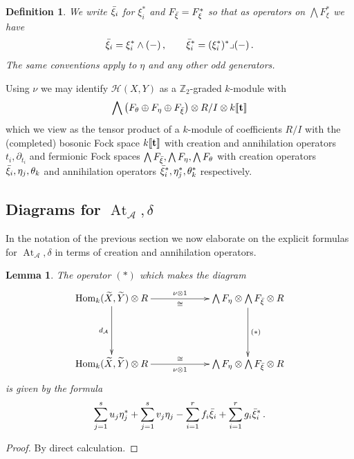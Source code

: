 \documentclass[english,letter paper,12pt,leqno]{article}
\newtheorem{lemma}[theorem]{Lemma}
\theoremstyle{example}
\newtheorem{definition}[theorem]{Definition}
\numberwithin{equation}{section}
\def\AA{\mathcal{A}}
\def\HH{\HH}
\def\HH{\mathcal{H}}
\def\Hom{\operatorname{Hom}}
\def\be{\begin{equation}}
\def\ee{\end{equation}}
\def\nZ{\mathds{Z}}
\DeclareMathOperator{\vAt}{At}
\begin{document}
\begin{definition}\label{defn:bar_convention} We write $\Bar{\xi}_i$ for $\xi_i^*$ and $F_{\Bar{\xi}} = F_\xi^*$ so that as operators on $\bigwedge F_\xi^*$ we have
\[
\Bar{\xi}_i = \xi_i^* \wedge (-)\,, \qquad \Bar{\xi}_i^* = (\xi_i^*)^* \lrcorner (-)\,.
\]
The same conventions apply to $\eta$ and any other odd generators.
\end{definition}

Using $\nu$ we may identify $\HH(X,Y)$ as a $\nZ_2$-graded $k$-module with
\be\label{eq:presentationHHalt}
\bigwedge \big( F_\theta \oplus F_\eta \oplus F_{\Bar{\xi}} \big) \otimes R/I \otimes k\llbracket \bold{t} \rrbracket
\ee
which we view as the tensor product of a $k$-module of coefficients $R/I$ with the (completed) bosonic Fock space $k\llbracket \bold{t} \rrbracket$ with creation and annihilation operators $t_i, \partial_{t_i}$ and fermionic Fock spaces $\bigwedge F_{\Bar{\xi}}, \bigwedge F_\eta, \bigwedge F_\theta$ with creation operators $\Bar{\xi}_i, \eta_j, \theta_k$ and annihilation operators $\Bar{\xi}_i^*, \eta_j^*, \theta_k^*$ respectively. 

\subsection{Diagrams for $\vAt_{\AA}, \delta$}\label{section:fenyman_diagram_1}

In the notation of the previous section we now elaborate on the explicit formulas for $\vAt_{\AA},\delta$ in terms of creation and annihilation operators.

\begin{lemma}\label{lemma:transfer} The operator $(*)$ which makes the diagram
\[
\xymatrix@C+3pc@R+2pc{
\Hom_k( \widetilde{X}, \widetilde{Y} ) \otimes R \ar[d]_-{d_{\AA}} \ar[r]_-{\cong}^-{ \nu \otimes 1} & \bigwedge F_\eta \otimes \bigwedge F_{\Bar{\xi}} \otimes R \ar[d]^-{(*)}\\
\Hom_k( \widetilde{X}, \widetilde{Y} ) \otimes R \ar[r]^-{\cong}_-{ \nu \otimes 1 } & \bigwedge F_\eta \otimes \bigwedge F_{\Bar{\xi}} \otimes R
}
\]
is given by the formula
\[
\sum_{j=1}^s u_j \eta_j^* + \sum_{j=1}^s v_j \eta_j - \sum_{i=1}^r f_i \Bar{\xi}_i + \sum_{i=1}^r g_i \Bar{\xi}_i^*\,.
\]
\end{lemma}
\begin{proof}
By direct calculation.
\end{proof}
\end{document}
